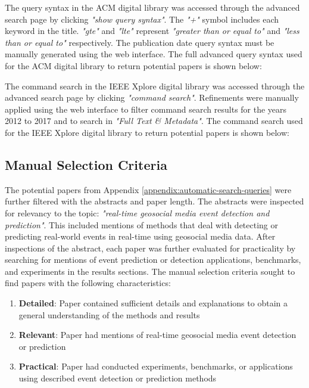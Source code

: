 \begin{appendices}
The query syntax in the ACM digital library was accessed through the advanced search page by clicking \textit{"show query syntax"}. The \textit{"+"} symbol includes each keyword in the title. \textit{"gte"} and \textit{"lte"} represent \textit{"greater than or equal to"} and \textit{"less than or equal to"} respectively. The publication date query syntax must be manually generated using the web interface. The full advanced query syntax used for the ACM digital library to return potential papers is shown below:



The command search in the IEEE Xplore digital library was accessed through the advanced search page by clicking \textit{"command search"}. Refinements were manually applied using the web interface to filter command search results for the years 2012 to 2017 and to search in \textit{"Full Text \& Metadata"}. The command search used for the IEEE Xplore digital library to return potential papers is shown below:



\subsection{Manual Selection Criteria} \label{appendix:manual-selection-criteria}

The potential papers from Appendix \ref{appendix:automatic-search-queries} were further filtered with the abstracts and paper length. The abstracts were inspected for relevancy to the topic: \textit{"real-time geosocial media event detection and prediction"}. This included mentions of methods that deal with detecting or predicting real-world events in real-time using geosocial media data. After inspections of the abstract, each paper was further evaluated for practicality by searching for mentions of event prediction or detection applications, benchmarks, and experiments in the results sections. The manual selection criteria sought to find papers with the following characteristics:

\begin{enumerate}[label=(\alph*)]
	\item \textbf{Detailed}: Paper contained sufficient details and explanations to obtain a general understanding of the methods and results
	\item \textbf{Relevant}: Paper had mentions of real-time geosocial media event detection or prediction
	\item \textbf{Practical}: Paper had conducted experiments, benchmarks, or applications using described event detection or prediction methods
\end{enumerate}


\end{appendices}
